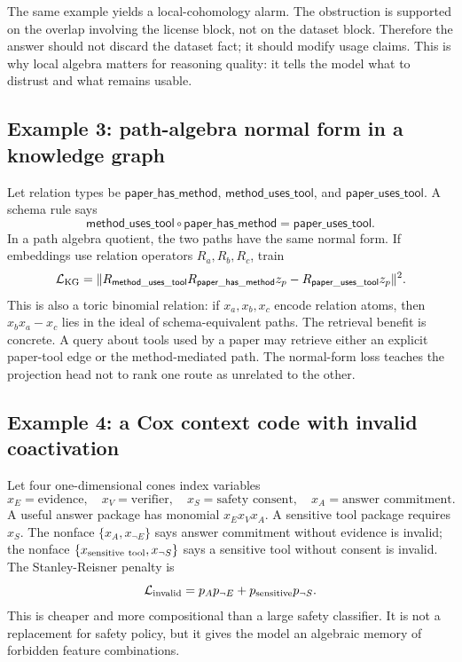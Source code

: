 \documentclass[11pt]{article}
\newcommand{\loss}{\mathcal{L}}
\newcommand{\onecones}{one-dimensional cones}
\numberwithin{equation}{section}
\begin{document}
The same example yields a local-cohomology alarm. The obstruction is supported on the overlap involving the license block, not on the dataset block. Therefore the answer should not discard the dataset fact; it should modify usage claims. This is why local algebra matters for reasoning quality: it tells the model what to distrust and what remains usable.

\subsection{Example 3: path-algebra normal form in a knowledge graph}
Let relation types be $\mathsf{paper\_has\_method}$, $\mathsf{method\_uses\_tool}$, and $\mathsf{paper\_uses\_tool}$. A schema rule says
\begin{equation}
\mathsf{method\_uses\_tool}\circ \mathsf{paper\_has\_method}=\mathsf{paper\_uses\_tool}.
\end{equation}
In a path algebra quotient, the two paths have the same normal form. If embeddings use relation operators $R_a,R_b,R_c$, train
\begin{equation}
\loss_{\rm KG}=\|R_{\mathsf{method\_uses\_tool}}R_{\mathsf{paper\_has\_method}}z_p-R_{\mathsf{paper\_uses\_tool}}z_p\|^2.
\end{equation}
This is also a toric binomial relation: if $x_a,x_b,x_c$ encode relation atoms, then $x_bx_a-x_c$ lies in the ideal of schema-equivalent paths. The retrieval benefit is concrete. A query about tools used by a paper may retrieve either an explicit paper-tool edge or the method-mediated path. The normal-form loss teaches the projection head not to rank one route as unrelated to the other.

\subsection{Example 4: a Cox context code with invalid coactivation}
Let four \onecones{} index variables
\begin{equation}
x_E=\text{evidence},\quad x_V=\text{verifier},\quad x_S=\text{safety consent},\quad x_A=\text{answer commitment}.
\end{equation}
A useful answer package has monomial $x_E x_V x_A$. A sensitive tool package requires $x_S$. The nonface $\{x_A,x_{\neg E}\}$ says answer commitment without evidence is invalid; the nonface $\{x_{\rm sensitive\ tool},x_{\neg S}\}$ says a sensitive tool without consent is invalid. The Stanley-Reisner penalty is
\begin{equation}
\loss_{\rm invalid}=p_Ap_{\neg E}+p_{\rm sensitive}p_{\neg S}.
\end{equation}
This is cheaper and more compositional than a large safety classifier. It is not a replacement for safety policy, but it gives the model an algebraic memory of forbidden feature combinations.
\end{document}
